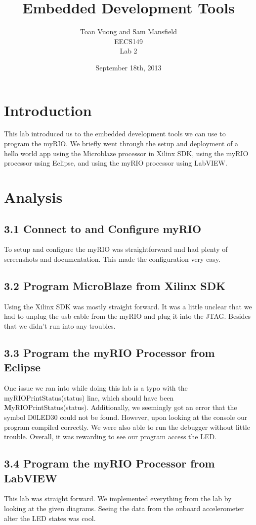 \documentclass[10pt]{article}
\begin{document}
\title{Embedded Development Tools}
\author{Toan Vuong and Sam Mansfield\\
        EECS149\\
        Lab 2}
\date{September 18th, 2013}
\maketitle

\section*{Introduction}
  This lab introduced us to the embedded development tools we can use to program the myRIO. We briefly went through the setup and deployment of a hello world app using the Microblaze processor in Xilinx SDK, using the myRIO processor using Eclipse, and using the myRIO processor using LabVIEW.
\section*{Analysis}
  \subsection*{3.1 Connect to and Configure myRIO}
    To setup and configure the myRIO was straightforward and had plenty of screenshots and documentation. This made the configuration very easy.
  \subsection*{3.2 Program MicroBlaze from Xilinx SDK}
    Using the Xilinx SDK was mostly straight forward. It was a little unclear that we had to unplug the usb cable from the myRIO and plug it into the JTAG. Besides that we didn't run into any troubles.
  \subsection*{3.3 Program the myRIO Processor from Eclipse}
    One issue we ran into while doing this lab is a typo with the myRIO\textunderscore PrintStatus(status) line, which should have been \textbf{M}yRIO\textunderscore PrintStatus(status). Additionally, we seemingly got an error that the symbol D0LED30 could not be found. However, upon looking at the console our program compiled correctly. We were also able to run the debugger without little trouble. Overall, it was rewarding to see our program access the LED.
  \subsection*{3.4 Program the myRIO Processor from LabVIEW}
    This lab was straight forward. We implemented everything from the lab by looking at the given diagrams. Seeing the data from the onboard accelerometer alter the LED states was cool. 
\end{document}
